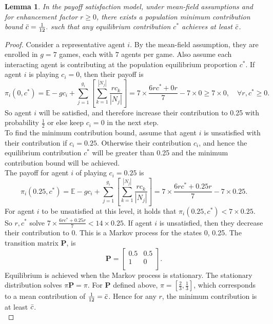 \newtheorem{lemma_mcb}[theorem]{Lemma} \label{mcb}
\begin{lemma_mcb}
In the \emph{payoff satisfaction} model, under mean-field assumptions and for enhancement factor $r \geq0$, there exists a population minimum contribution bound $\Bar{c} = \tfrac{1}{12}.$ such that any equilibrium contribution $c^*$ achieves at least $\Bar{c}$.  \end{lemma_mcb}
\begin{proof}
Consider a representative agent $i$. By the mean-field assumption, they are enrolled in $g=7$ games, each with $7$ agents per game. Also assume each interacting agent is contributing at the population equilibrium proportion $c^*$. If agent $i$ is playing $c_i = 0$, then their payoff is \\
\begin{equation}
    \pi_i(0, c^*)= \mathbb E - gc_i + \sum_{j=1}^{g_i} [\sum_{k=1}^{|N_j|} \frac{rc_k}{|N_j|}] =   7\times\frac{6rc^* + 0r}{7}-7\times0 \geq 7\times0, \quad \forall r, c^* \geq 0.
\end{equation}
So agent $i$ will be satisfied, and therefore increase their contribution to 0.25 with probability $\tfrac{1}{2}$ or else keep $c_i = 0$ in the next step. \\

To find the minimum contribution bound, assume that agent $i$ is unsatisfied with their contribution if $c_i = 0.25$. Otherwise their contribution $c_i$, and hence the equilibrium contribution $c^*$ will be greater than 0.25 and the minimum contribution bound will be achieved. \\

The payoff for agent $i$ of playing $c_i=0.25$ is  \\
\begin{equation} \label{unsat}
    \pi_i(0.25, c^*)= \mathbb E - gc_i + \sum_{j=1}^{g_i} [\sum_{k=1}^{|N_j|} \frac{rc_k}{|N_j|}]  =   7\times\frac{6rc^* + 0.25r}{7}-7\times0.25. 
\end{equation}
For agent $i$ to be unsatisfied at this level, it holds that $\pi_i(0.25, c^*) <7\times 0.25$. So $r,c^*$ solve $7\times\frac{6rc^* + 0.25r}{7}<14\times0.25$. If agent $i$ is unsatisfied, then they decrease their contribution to 0. This is a Markov process for the states 0, 0.25. The transition matrix $\mathbf{P}$, is $$\mathbf P = \begin{bmatrix} 0.5& 0.5 \\
1& 0 \\
\end{bmatrix}. $$  Equilibrium is achieved when the Markov process is stationary. The stationary distribution solves $\pi \mathbf{P} = \pi$. For $\mathbf{P}$ defined above, $\pi = [\tfrac{2}{3}, \tfrac{1}{3}]$, which corresponds to a mean contribution of $\tfrac{1}{12} =\Bar{c}$. Hence for any $r$, the minimum contribution is at least $\Bar{c}$. \\
\end{proof}

